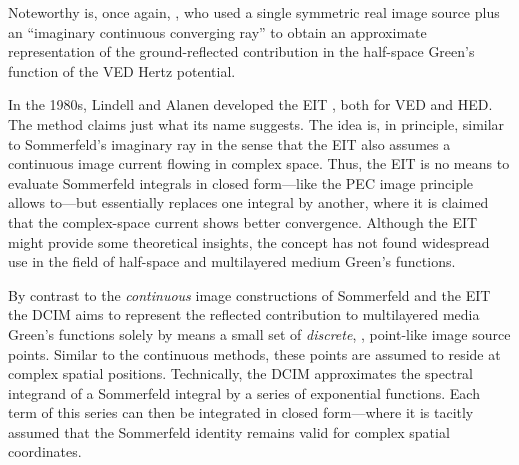Noteworthy is, once again, \textcite[250]{Sommerfeld1964}, who used a single
symmetric real image source plus an \enquote{imaginary continuous converging
ray} to obtain an approximate representation of the ground-reflected
contribution in the half-space Green's function of the \ac{VED} Hertz potential.

In the 1980s, Lindell and Alanen developed the \ac{EIT} 
\cite{Lindell1984,Lindell1984a,Lindell1984b}, both for \ac{VED} and \ac{HED}.
The method claims just what its name suggests.
The idea is, in principle, similar to Sommerfeld's imaginary ray in the sense
that the \ac{EIT} also assumes a continuous image current flowing in complex
space.
Thus, the \ac{EIT} is no means to evaluate Sommerfeld integrals in closed
form---like the \ac{PEC} image principle allows to---but essentially
replaces one integral by another, where it is claimed that the complex-space
current shows better convergence.
Although the \ac{EIT} might provide some theoretical insights, the concept
has not found widespread use in the field of half-space and multilayered medium 
Green's functions.

By contrast to the \emph{continuous} image constructions of Sommerfeld and the
\ac{EIT} the \ac{DCIM} aims to represent the reflected contribution to
multilayered media Green's functions solely by means a small set
of \emph{discrete}, \ie, point-like image source points.
Similar to the continuous methods, these points are assumed to reside 
at complex spatial positions.
Technically, the \ac{DCIM} approximates the spectral integrand of a Sommerfeld
integral by a series of exponential functions.
Each term of this series can then be integrated in closed form---where it is
tacitly assumed that the Sommerfeld identity remains valid for complex spatial
coordinates.

